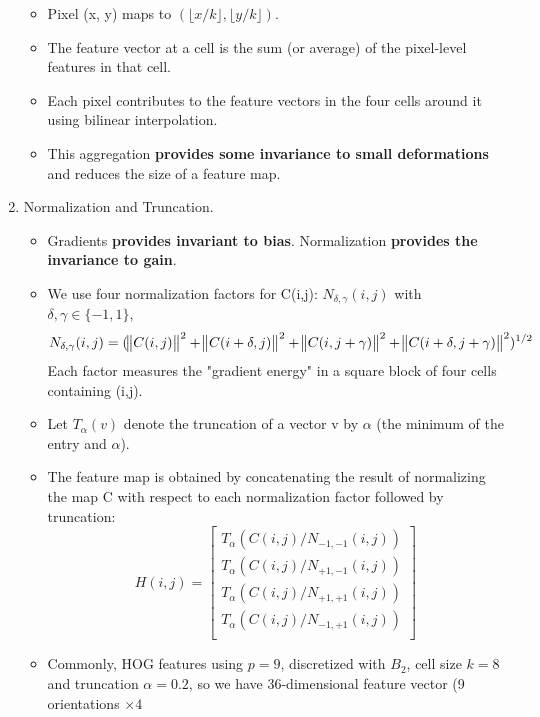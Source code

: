 \documentclass[12pt]{article}
\numberwithin{equation}{section}
\begin{document}
\begin{enumerate}
\begin{itemize}
			\item Pixel (x, y) maps to $(\lfloor{x/k}\rfloor, \lfloor{y/k}\rfloor)$.
			\item The feature vector at a cell is the sum (or average) of the pixel-level features in that cell.
			\item Each pixel contributes to the feature vectors in the four cells around it using 
			bilinear interpolation.
			\item This aggregation \textbf{provides some invariance to small deformations} and reduces the size
			of a feature map.
		\end{itemize}
	\item Normalization and Truncation.
		\begin{itemize}
			\item Gradients \textbf{provides invariant to bias}. Normalization \textbf{provides the invariance to gain}.
			\item We use four normalization factors for C(i,j): $N_{\delta, \gamma}(i,j)$ with 
			$\delta, \gamma \in \{-1, 1\}$,
				\begin{equation}
					N_{\delta, \gamma}(i,j)=(\norm{C(i,j)}^2+\norm{C(i+\delta,j)}^2+
									\norm{C(i,j+\gamma)}^2+\norm{C(i+\delta,j+\gamma)}^2)^{1/2}
				\end{equation}
			Each factor measures the "gradient energy" in a square block of four cells containing (i,j).
			\item Let $T_{\alpha}(v)$ denote the truncation of a vector  v by $\alpha$ (the minimum of the entry and $\alpha$).
			\item The feature map is obtained by concatenating the result of normalizing the map C with respect
			 to each normalization factor followed by truncation:
			 	\begin{equation}
					H(i,j)=
					\begin{bmatrix}
						T_{\alpha}(C(i,j)/N_{-1, -1}(i,j)) \\
						T_{\alpha}(C(i,j)/N_{+1, -1}(i,j)) \\
						T_{\alpha}(C(i,j)/N_{+1, +1}(i,j)) \\
						T_{\alpha}(C(i,j)/N_{-1, +1}(i,j)) \\
					\end{bmatrix}
				\end{equation}
			\item Commonly, HOG features using $p=9$, discretized with $B_2$, cell size $k=8$ and truncation 
			$\alpha = 0.2$, so we have 36-dimensional feature vector (9 orientations $ \times 4$ 

\end{itemize}
\end{enumerate}
\end{document}
